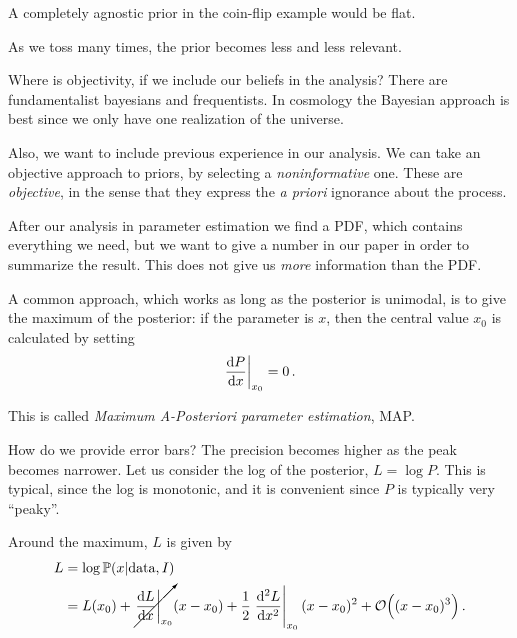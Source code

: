 \documentclass[main.tex]{subfiles}
\begin{document}


A completely agnostic prior in the coin-flip example would be flat.

As we toss many times, the prior becomes less and less relevant. 

Where is objectivity, if we include our beliefs in the analysis?
There are fundamentalist bayesians and frequentists.
In cosmology the Bayesian approach is best since we only have one realization of the universe. 

Also, we want to include previous experience in our analysis. 
We can take an objective approach to priors, by selecting a \emph{noninformative} one. 
These are \emph{objective}, in the sense that they express the \emph{a priori} ignorance about the process. 

After our analysis in parameter estimation we find a PDF, which contains everything we need, but we want to give a number in our paper in order to summarize the result.
This does not give us \emph{more} information than the PDF. 

A common approach, which works as long as the posterior is unimodal, is to give the maximum of the posterior: if the parameter is \(x\), then the central value \(x_0 \) is calculated by setting 
%
\begin{align}
\eval{\dv{P}{x}}_{x_0 } = 0 
\,.
\end{align}

This is called \emph{Maximum A-Posteriori parameter estimation}, MAP.

How do we provide error bars? 
The precision becomes higher as the peak becomes narrower. 
Let us consider the log of the posterior, \(L = \log P\). This is typical, since the log is monotonic, and it is convenient since \(P\) is typically very ``peaky''.

Around the maximum, \(L\) is given by 
%
\begin{align}
L &= \log \mathbb{P}(x | \text{data}, I)  \\
&= L (x_0 ) + \cancelto{}{\eval{\dv{L}{x}}_{x_0 }} (x- x_0 )
+ \frac{1}{2} \eval{\dv[2]{L}{x}}_{x_0 } (x- x_0 )^2 + \order{(x-x_0 )^3}
\,.
\end{align}
\end{document}

